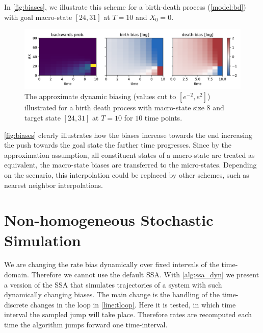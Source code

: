 In \autoref{fig:biases}, we illustrate this scheme for a birth-death
process (\autoref{model:bd}) with goal macro-state $[24,31]$ at
$T=10$ and $X_0=0$.
\begin{figure}
  \centering
  \includegraphics[width=\textwidth]{gfx/biases.pdf}
  \caption[Approximate biasing]{\label{fig:biases}The approximate
    dynamic biasing (values cut to $[e^{-2}, e^{2}]$) illustrated for a
    birth death process with macro-state size $8$ and target state
  $[24, 31]$ at $T=10$ for $10$ time points.}
\end{figure}
\autoref{fig:biases} clearly illustrates how the biases increase
towards the end increasing the push towards the goal state the
farther time progresses.
Since by the approximation assumption, all constituent states of a
macro-state are treated as equivalent, the macro-state biases are
transferred to the micro-states.
Depending on the scenario, this interpolation could be replaced by
other schemes, such as nearest neighbor interpolations.

\section{Non-homogeneous Stochastic Simulation}
We are changing the rate bias dynamically over fixed intervals of the
time-domain.
Therefore we cannot use the default \ac{SSA}.
With \autoref{alg:ssa_dyn} we present a version of the \acl{SSA} that
simulates trajectories of a system with such dynamically changing biases.
The main change is the handling of the time-discrete changes in the
loop in \autoref{line:tloop}.
Here it is tested, in which time interval the sampled jump will take place.
Therefore rates are recomputed each time the algorithm jumps forward
one time-interval.

